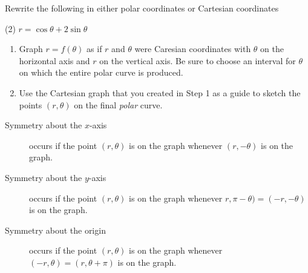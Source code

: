 \documentclass[../mathNotesPreamble]{subfiles}
\begin{document}
  \begin{ex*}
    Rewrite the following in either polar coordinates or Cartesian coordinates
  \end{ex*}
  \begin{tasks}[after-item-skip=\stretch{1}, label=,item-indent=0pt](2)
    \task $r=\cos\theta+2\sin\theta$
    \task $ $
    \task 
    \task 
  \end{tasks}
  \pagebreak

  \begin{thmBox*}[Procedure: Cartesian-to-Polar Method for Graphing $r=f(\theta)$]
    \begin{enumerate}
      \item Graph $r=f(\theta)$ as if $r$ and $\theta$ were Caresian coordinates with $\theta$ on the horizontal axis and $r$ on the vertical axis. Be sure to choose an interval for $\theta$ on which the entire polar curve is produced.
      \item Use the Cartesian graph that you created in Step 1 as a guide to sketch the points $(r,\theta)$ on the final \textit{polar} curve.
    \end{enumerate}
  \end{thmBox*}

  \begin{thmBox*}
    \begin{description}
      \item[Symmetry about the $x$-axis] occurs if the point $(r,\theta)$ is on the graph whenever $(r,-\theta)$ is on the graph.
      \item[Symmetry about the $y$-axis] occurs if the point $(r,\theta)$ is on the graph whenever $r,\pi-\theta)=(-r,-\theta)$ is on the graph.
      \item[Symmetry about the origin] occurs if the point $(r,\theta)$ is on the graph whenever $(-r,\theta)=(r,\theta+\pi)$ is on the graph.
    \end{description}
  \end{thmBox*}
\end{document}
